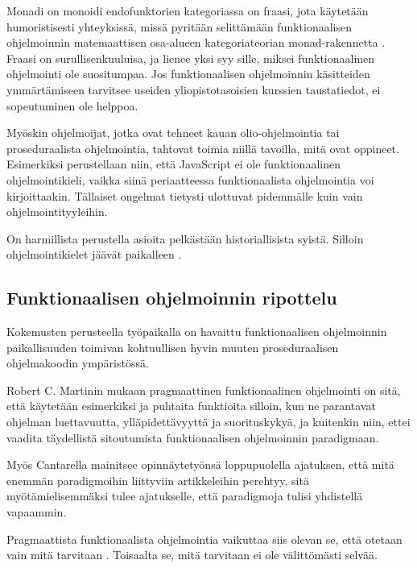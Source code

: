 Monadi on monoidi endofunktorien kategoriassa on fraasi, jota käytetään humoristisesti yhteyksissä, missä pyritään selittämään funktionaalisen ohjelmoinnin matemaattisen osa-alueen kategoriateorian \gls{monad}-rakennetta \cite{bartosz_category_for_progamers_10}. Fraasi on surullisenkuuluisa, ja lienee yksi syy sille, miksei funktionaalinen ohjelmointi ole suositumpaa. Jos funktionaalisen ohjelmoinnin käsitteiden ymmärtämiseen tarvitsee useiden yliopistotasoisien kurssien taustatiedot, ei sopeutuminen ole helppoa.

Myöskin ohjelmoijat, jotka ovat tehneet kauan olio-ohjelmointia tai proseduraalista ohjelmointia, tahtovat toimia niillä tavoilla, mitä ovat oppineet. Esimerkiksi perustellaan niin, että JavaScript ei ole funktionaalinen ohjelmointikieli, vaikka siinä periaatteessa funktionaalista ohjelmointia voi kirjoittaakin. Tällaiset ongelmat tietysti ulottuvat pidemmälle kuin vain ohjelmointityyleihin. \citep{is_reduce_bad}

On harmillista perustella asioita pelkästään historiallisista syistä. Silloin ohjelmointikielet jäävät paikalleen \cite{promises-spec-94}.

\subsection{Funktionaalisen ohjelmoinnin ripottelu}

Kokemusten perusteella työpaikalla on havaittu funktionaalisen ohjelmoinnin paikallisuuden toimivan kohtuullisen hyvin muuten proseduraalisen ohjelmakoodin ympäristössä.

Robert C. Martinin mukaan pragmaattinen funktionaalinen ohjelmointi on sitä, että käytetään esimerkiksi  ja puhtaita funktioita silloin, kun ne parantavat ohjelman luettavuutta, ylläpidettävyyttä ja suorituskykyä, ja kuitenkin niin, ettei vaadita täydellistä sitoutumista funktionaalisen ohjelmoinnin paradigmaan. \citep{martin2017pragmaticfp}

Myös Cantarella mainitsee opinnäytetyönsä loppupuolella ajatuksen, että mitä enemmän paradigmoihin liittyviin artikkeleihin perehtyy, sitä myötämielisemmäksi tulee ajatukselle, että paradigmoja tulisi yhdistellä vapaammin. \citep[45]{cantarella_fp_haitat}

Pragmaattista funktionaalista ohjelmointia vaikuttaa siis olevan se, että otetaan vain mitä tarvitaan \cite{dear_functional_bros,martin2017pragmaticfp,cantarella_fp_haitat}. Toisaalta se, mitä tarvitaan ei ole välittömästi selvää.

